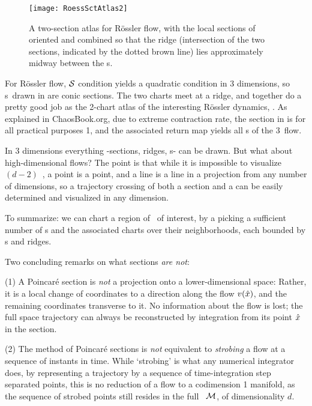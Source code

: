 \begin{figure}%
\begin{center}
  \texttt{[image: RoessSctAtlas2]}
\end{center}
  \caption{
  A two-section atlas for R\"ossler flow, with the local sections of
   oriented and combined so that
  the ridge (intersection of the two sections, indicated by the dotted
  brown line) lies  approximately midway between the \template s.
  } \label{fig:RoessBothEq}
\end{figure}


For R\"ossler flow, ${\cal S}$ condition  yields a
quadratic condition in 3 dimensions, so \poincBord s\ drawn in
 are conic sections. The two
charts meet at a ridge, and together do a pretty good job as the 2-chart
atlas of the interesting R\"ossler dynamics, . As
explained in ChaosBook.org\cite{DasBuch}, due to extreme contraction
rate, the section in  is for all practical
purposes 1\dmn, and the associated return map yields all \po s of the
3\dmn\ flow.

In 3 dimensions everything -sections, ridges, \poincBord s-  can be
drawn. But what about high-dimensional flows? The point is that while it
is impossible to visualize  $(d\!-\!2)$\dmn\ {\poincBord}, a point is a
point, and a line is a line in a projection from any number of
dimensions, so a trajectory crossing of both a section and a {\poincBord}
can be easily determined and visualized in any dimension.

To summarize: we can chart a region of \statesp\ of interest, by a
picking a sufficient number of \template s and the associated charts over
their neighborhoods, each bounded by \poincBord s and ridges.

Two concluding remarks on what sections \emph{are not}:

(1) A Poincar\'e section is {\em not} a projection onto a
lower-dimensional space: Rather, it is a local change of coordinates to a
direction along the flow $v(\hat{x})$, and the remaining coordinates
transverse to it. No information about the flow is lost; the full space
trajectory can always be reconstructed by integration from its point
$\hat{x}$ in the section.

(2) The method of Poincar\'e sections is {\em not} equivalent to
\emph{strobing} a flow at a sequence of instants in time. While
`strobing' is what any numerical integrator does, by representing a
trajectory by a sequence of time-integration step separated points, this
is no reduction of a flow to a codimension 1 manifold, as the sequence of
strobed points still resides in the full \statesp\ ${\cal M}$, of
dimensionality $d$.
